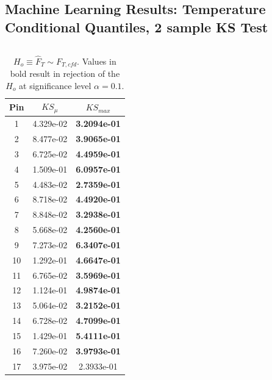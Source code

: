 \documentclass[t, pdftex]{beamer}
\begin{document}
\subsection*{Machine Learning Results: Temperature Conditional Quantiles, 2 sample KS Test}
\begin{frame}
\vspace{-33pt}
\begin{columns}
    \begin{column}{0.5\textwidth}
\begin{table}[h]
    \tiny
    \begin{center}
        \caption[KS statistic temperature summary.]{$H_o\equiv \hat F_T \sim F_{T,cfd}$. Values in bold result in rejection of the $H_o$ at significance level $\alpha=0.1$.}
        \begin{tabular}[h]{|c|c|c|}
            \hline
            Pin & $KS_\mu$ & $KS_{max}$ \\
            \hline
            1 &  4.329e-02 &  \textbf{3.2094e-01} \\
            2 &  8.477e-02 &  \textbf{3.9065e-01} \\
            3 &  6.725e-02 &  \textbf{4.4959e-01} \\
            4 &  1.509e-01 &  \textbf{6.0957e-01} \\
            5 &  4.483e-02 &  \textbf{2.7359e-01} \\
            6 &  8.718e-02 &  \textbf{4.4920e-01} \\
            7 &  8.848e-02 &  \textbf{3.2938e-01} \\
            8 &  5.668e-02 &  \textbf{4.2560e-01} \\
            9 &  7.273e-02 &  \textbf{6.3407e-01} \\
            10 & 1.292e-01 &  \textbf{4.6647e-01} \\
            11 & 6.765e-02 &\textbf{ 3.5969e-01} \\
            12 & 1.124e-01 & \textbf{4.9874e-01} \\
            13 & 5.064e-02 & \textbf{3.2152e-01} \\
            14 & 6.728e-02 & \textbf{4.7099e-01} \\
            15 & 1.429e-01 &\textbf{ 5.4111e-01} \\
            16 & 7.260e-02 & \textbf{3.9793e-01} \\
            17 & 3.975e-02 & 2.3933e-01 \\

\end{tabular}
\end{center}
\end{table}
\end{column}
\end{columns}
\end{frame}
\end{document}
